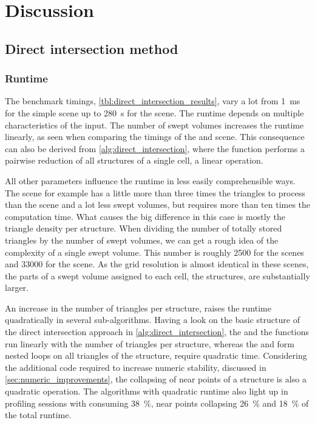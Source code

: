 
\chapter{Discussion}
\label{ch:discussion}


\section{Direct intersection method}
\label{sec:direct_intersection_discussion}


\subsection{Runtime}

The benchmark timings, \cf \cref{tbl:direct_intersection_results}, vary a lot from \SI{1}{\milli\second} for the simple \cubes scene up to \SI{280}{\second} for the \turbine scene.
The runtime depends on multiple characteristics of the input.
The number of swept volumes increases the runtime linearly, as seen when comparing the timings of the \impeller and \impellerhalf scene.
This consequence can also be derived from \cref{alg:direct_intersection}, where the  function performs a pairwise reduction of all structures of a single cell, a linear operation.

All other parameters influence the runtime in less easily comprehensible ways.
The \turbine scene for example has a little more than three times the triangles to process than the \impeller scene and a lot less swept volumes, but requires more than ten times the computation time.
What causes the big difference in this case is mostly the triangle density per structure.
When dividing the number of totally stored triangles by the number of swept volumes, we can get a rough idea of the complexity of a single swept volume.
This number is roughly 2500 for the \impeller scenes and 33000 for the \turbine scene.
As the grid resolution is almost identical in these scenes, the parts of a swept volume assigned to each cell, \ie the structures, are substantially larger.

An increase in the number of triangles per structure, raises the runtime quadratically in several sub-algorithms.
Having a look on the basic structure of the direct intersection approach in \cref{alg:direct_intersection}, the  and the  functions run linearly with the number of triangles per structure, whereas the  and  form nested loops on all triangles of the structure, \ie require quadratic time.
Considering the additional code required to increase numeric stability, discussed in \cref{sec:numeric_improvements}, the collapsing of near points of a structure is also a quadratic operation.
The algorithms with quadratic runtime also light up in profiling sessions with  consuming \SI{38}{\percent}, near points collapsing \SI{26}{\percent} and  \SI{18}{\percent} of the total runtime.

